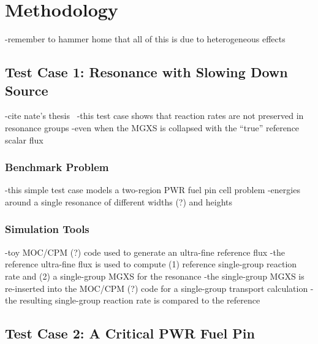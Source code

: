 \section{Methodology}
\label{sec:methodology}

-remember to hammer home that all of this is due to heterogeneous effects


\subsection{Test Case 1: Resonance with Slowing Down Source}
\label{subsec:test-case1}

-cite nate's thesis~\cite{gibson2016thesis}
-this test case shows that reaction rates are not preserved in resonance groups
  -even when the MGXS is collapsed with the ``true'' reference scalar flux

\subsubsection{Benchmark Problem}
\label{subsubsec:benchmark-case1}

-this simple test case models a two-region PWR fuel pin cell problem
-energies around a single resonance of different widths (?) and heights

\subsubsection{Simulation Tools}
\label{subsubsec:sim-tools-case1}

-toy MOC/CPM (?) code used to generate an ultra-fine reference flux
-the reference ultra-fine flux is used to compute (1) reference single-group reaction rate and (2) a single-group MGXS for the resonance
-the single-group MGXS is re-inserted into the MOC/CPM (?) code for a single-group transport calculation
-the resulting single-group reaction rate is compared to the reference



\subsection{Test Case 2: A Critical PWR Fuel Pin}
\label{subsec:test-case2}

